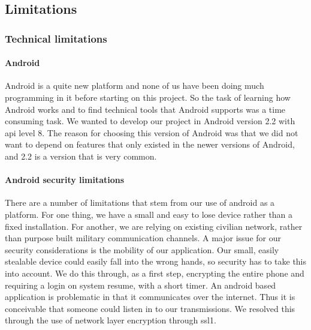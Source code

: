 \subsection{Limitations}

\subsubsection{Technical limitations}

\paragraph{Android}\hfill
\newline
Android is a quite new platform and none of us have been doing much programming in it before starting on this project. So the task of learning how Android works and to find technical tools that Android supports was a time consuming task. We wanted to develop our project in Android version 2.2 with \gls{api} level 8. The reason for choosing this version of Android was that we did not want to depend on features that only existed in the newer versions of Android, and 2.2 is a version that is very common.

\newpage

\paragraph{Android security limitations}\hfill
\newline
There are a number of limitations that stem from our use of android as a platform. For one thing, we have a small and easy to lose device rather than a fixed installation. For another, we are relying on existing civilian network, rather than purpose built military communication channels.
\newline
\newline
A major issue for our security considerations is the mobility of our application. Our small, easily stealable device could easily fall into the wrong hands, so security has to take this into account. We do this through, as a first step, encrypting the entire phone and requiring a login on system resume, with a short timer.
\newline
\newline
An android based application is problematic in that it communicates over the internet. Thus it is conceivable that someone could listen in to our transmissions. We resolved this through the use of network layer encryption through \gls{ssl1}. 

